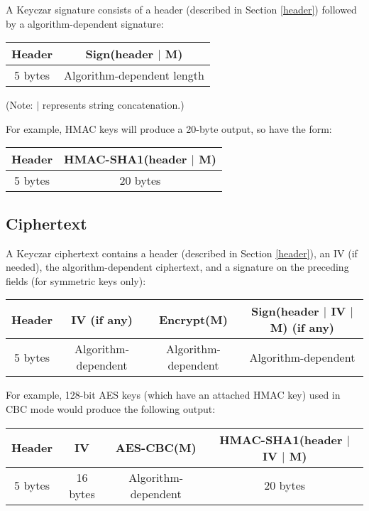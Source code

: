 \documentclass{llncs}
\begin{document}
A Keyczar signature consists of a header (described in Section \ref{header})
followed by a algorithm-dependent signature:

\vspace*{3mm}
\begin{tabular}{| c | c |}
\hline
Header & Sign(header $|$ M) \\
\hline 5 bytes & Algorithm-dependent length \\ \hline
\end{tabular}
\vspace*{3mm}

(Note: $|$ represents string concatenation.)

\vspace*{3mm}

For example, HMAC keys will produce a 20-byte output, so have the form:

\vspace*{3mm}
\begin{tabular}{| c | c |}
\hline
Header & HMAC-SHA1(header $|$ M) \\ \hline
5 bytes & 20 bytes \\ \hline
\end{tabular}
\vspace*{3mm}
\subsection{Ciphertext}

A Keyczar ciphertext contains a header (described in Section \ref{header}), an
IV (if needed), the algorithm-dependent ciphertext, and a signature on the
preceding fields (for symmetric keys only):

\vspace*{3mm}
\begin{tabular}{| c | c | c | c |}
\hline
Header & IV (if any) & Encrypt(M) & Sign(header $|$ IV $|$ M) (if any) \\ \hline
5 bytes & Algorithm-dependent & Algorithm-dependent & Algorithm-dependent \\
\hline
\end{tabular}
\vspace*{3mm}

For example, 128-bit AES keys (which have an attached HMAC key) used in CBC
mode would produce the following output:

\vspace*{3mm}
\begin{tabular}{| c | c | c | c |}
\hline
Header & IV & AES-CBC(M) & HMAC-SHA1(header $|$ IV $|$ M) \\ \hline
5 bytes & 16 bytes & Algorithm-dependent & 20 bytes \\
\hline
\end{tabular}
\vspace*{3mm}
\end{document}
